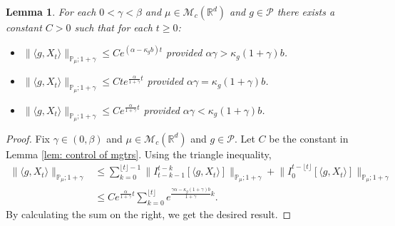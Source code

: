 \documentclass[12pt,oneside,english]{amsart}
\theoremstyle{plain}
\newtheorem{lem}[thm]{Lemma}
\theoremstyle{definition}
\numberwithin{equation}{section}
\begin{document}
\begin{lem}
\label{lemma24}
    For each $0 < \gamma < \beta$ and $\mu\in \mathcal M_c(\mathbb R^d)$ and $g\in \mathcal P$ there exists a constant $C>0$ such that for each $t\geq 0$:
\begin{itemize}
\item[(1)]
    $\|\langle g,X_t\rangle\|_{\mathbb{P}_{\mu};1+\gamma}\leq C e^{(\alpha-\kappa_g b)t}$ provided $\alpha\gamma > \kappa_g (1+\gamma)b$.
\item[(2)]
    $\|\langle g,X_t\rangle\|_{\mathbb{P}_{\mu};1+\gamma}\leq C te^{\frac{\alpha}{1+\gamma}t}$ provided $\alpha\gamma = \kappa_g (1+\gamma)b$.
\item[(3)]
    $\|\langle g,X_t\rangle\|_{\mathbb{P}_{\mu};1+\gamma}\leq C e^{\frac{\alpha}{1+\gamma}t}$ provided $\alpha\gamma < \kappa_g (1+\gamma)b$.
\end{itemize}
\end{lem}
\begin{proof}
    Fix $\gamma \in (0,\beta)$ and $\mu \in \mathcal M_c(\mathbb R^d)$ and $g\in \mathcal P$.
    Let $C$ be the constant in Lemma \ref{lem: control of mgtrs}.
    Using the triangle inequality,
\begin{align}
    \|\langle g,X_t\rangle\|_{\mathbb P_\mu;1+\gamma}
    &\leq \sum_{k=0}^{\lfloor t\rfloor - 1}\big\| I_{t-k-1}^{t-k}[\langle g,X_t\rangle] \big\|_{\mathbb P_\mu;1+\gamma}+\big\| I_{0}^{t-\lfloor t \rfloor}[\langle g,X_t\rangle]  \big\|_{\mathbb P_\mu;1+\gamma}
    \\ &\leq C e^{\frac{\alpha}{1+\gamma}t}\sum_{k=0}^{\lfloor t\rfloor} e^{\frac{\gamma\alpha-\kappa_g (1+\gamma)b}{1+\gamma} k} .
\end{align}
    By calculating the sum on the right, we get the desired result.
\end{proof}
\end{document}
